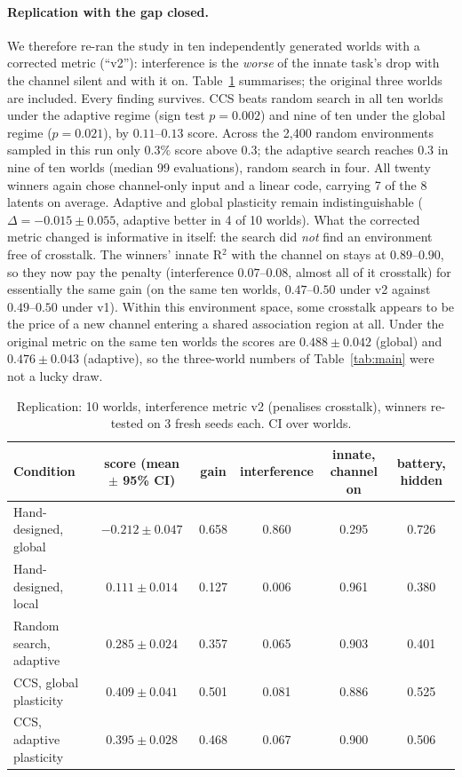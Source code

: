 \documentclass[11pt]{article}
\begin{document}
\paragraph{Replication with the gap closed.} We therefore re-ran the study in ten independently
generated worlds with a corrected metric (``v2''): interference is the \emph{worse} of the innate
task's drop with the channel silent and with it on. Table~\ref{tab:robust} summarises; the
original three worlds are included. Every finding survives. CCS beats random search in all ten
worlds under the adaptive regime (sign test $p=0.002$) and nine of ten under the global regime
($p=0.021$), by $0.11$--$0.13$ score. Across the 2{,}400 random environments sampled in this run only
$0.3\%$ score above $0.3$; the adaptive search reaches $0.3$ in nine of ten worlds (median 99
evaluations), random search in four. All twenty winners again chose channel-only input and a
linear code, carrying 7 of the 8 latents on average. Adaptive and global plasticity remain
indistinguishable ($\Delta=-0.015\pm0.055$, adaptive better in 4 of 10 worlds). What the corrected
metric changed is informative in itself: the search did \emph{not} find an environment free of
crosstalk. The winners' innate R$^2$ with the channel on stays at $0.89$--$0.90$, so they now pay
the penalty (interference $0.07$--$0.08$, almost all of it crosstalk) for essentially the same
gain (on the same ten worlds, $0.47$--$0.50$ under v2 against $0.49$--$0.50$ under v1). Within
this environment space, some crosstalk appears to be the price of a new channel entering a shared
association region at all. Under the original metric on the same ten worlds the scores are
$0.488\pm0.042$ (global) and $0.476\pm0.043$ (adaptive), so the three-world numbers of
Table~\ref{tab:main} were not a lucky draw.

\begin{table}[t]
\centering\small
\begin{tabular}{lccccc}
\toprule
Condition & score (mean $\pm$ 95\% CI) & gain & interference & innate, channel on & battery, hidden\\
\midrule
Hand-designed, global & $-0.212\pm0.047$ & 0.658 & 0.860 & 0.295 & 0.726\\
Hand-designed, local & $0.111\pm0.014$ & 0.127 & 0.006 & 0.961 & 0.380\\
Random search, adaptive & $0.285\pm0.024$ & 0.357 & 0.065 & 0.903 & 0.401\\
CCS, global plasticity & $\mathbf{0.409\pm0.041}$ & 0.501 & 0.081 & 0.886 & 0.525\\
CCS, adaptive plasticity & $\mathbf{0.395\pm0.028}$ & 0.468 & 0.067 & 0.900 & 0.506\\
\bottomrule
\end{tabular}
\caption{Replication: 10 worlds, interference metric v2 (penalises crosstalk), winners re-tested
on 3 fresh seeds each. CI over worlds.}
\label{tab:robust}
\end{table}
\end{document}
